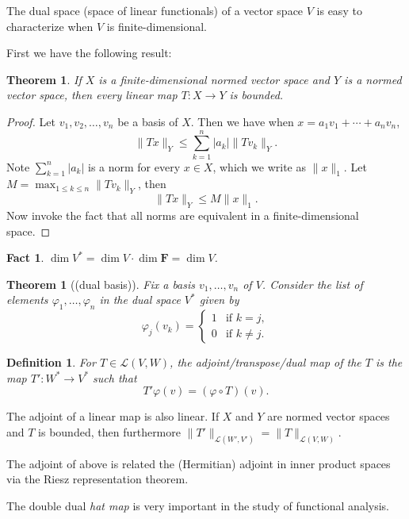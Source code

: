 \documentclass[10pt]{article}
\numberwithin{equation}{section}
\theoremstyle{plain-star}
\newtheorem{thm}[equation]{Theorem}
\newtheorem{fact}[equation]{Fact}
\theoremstyle{definition-star}
\newtheorem{defn}[equation]{Definition}
\theoremstyle{remark-star}
\theoremstyle{plain-star}
\newcommand{\F}{\mathbf{F}}
\newcommand{\nm}[1]{\lVert #1 \rVert}
\newcommand{\abs}[1]{\lvert #1 \rvert}
\newcommand{\LVW}{\mathcal{L}(V,W)}
\renewcommand{\phi}{\varphi}
\newcommand{\df}[1]{\textit{#1}}
\begin{document}
The dual space (space of linear functionals) of a vector space $V$ is easy to characterize when $V$ is finite-dimensional.

First we have the following result: 
\begin{thm}
    If $X$ is a finite-dimensional normed vector space and $Y$ is a normed vector space, then every linear map $T\colon X\to Y$ is bounded.
\end{thm}
\begin{proof}
    Let $v_1,v_2,\dotsc,v_n$ be a basis of $X$. Then we have when $
        x = a_1v_1+\dotsb+a_nv_n$, \[
        \nm{Tx}_Y\leq \sum_{k=1}^n \abs{a_k} \nm{Tv_k}_Y.
    \] Note $\sum_{k=1}^n \abs{a_k}$ is a norm for every $x \in X$, which we write as $\nm{x}_1$. Let $M = \max_{1\leq k \leq n} \nm{Tv_k}_Y$, then \[
        \nm{Tx}_Y \leq M\nm{x}_1.
    \] Now invoke the fact that all norms are equivalent in a finite-dimensional space.
\end{proof}
\begin{fact}
    $\dim V^* = \dim V \cdot \dim \F = \dim V$.
\end{fact}
\begin{thm}[(dual basis)]
    Fix a basis $v_1,\dotsc,v_n$ of $V$. Consider the list of elements $\phi_1,\dotsc,\phi_n$ in the dual space $V^*$ given by \[
        \phi_j(v_k) = \begin{cases}
            1 & \text{if } k = j, \\
            0 & \text{if } k \neq j.
        \end{cases}
    \]
\end{thm}

\begin{defn}
    For $T \in \LVW$, the \df{adjoint/transpose/dual map} of the $T$ is the map $T'\colon W^* \to V^*$ such that \[
        T'\phi(v) = (\phi \circ T)(v).
    \]
\end{defn}

The adjoint of a linear map is also linear. If $X$ and $Y$ are normed vector spaces and $T$ is bounded, then furthermore $\nm{T'}_{\mathcal{L}(W',V')} = \nm{T}_{\LVW}$.

The adjoint of above is related the (Hermitian) adjoint in inner product spaces via the Riesz representation theorem.

The double dual \emph{hat map} is very important in the study of functional analysis.
\end{document}
